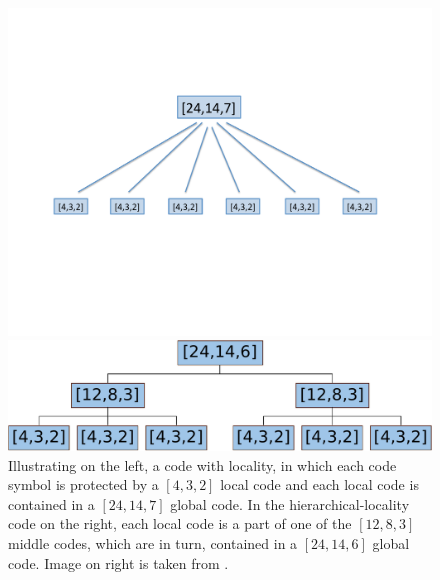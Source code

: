 \begin{figure}[h!]
\centering
		\begin{minipage}[b]{0.45\textwidth}
			\includegraphics[scale=.42]{src/Figures/chap4/flat} 
		\end{minipage}
		\hspace*{0.55in}
		\begin{minipage}[b]{0.44\textwidth}
			\includegraphics[scale=.38]{src/Figures/chap4/hierarchical}  
		\end{minipage}
	\caption{Illustrating on the left, a code with locality, in which each code symbol is protected by a $[4,3,2]$ local code and each local code is contained in a $[24,14,7]$ global code. In the hierarchical-locality code on the right, each local code is a part of one of the $[12,8,3]$ middle codes, which are in turn, contained in a $[24,14,6]$ global code. Image on right is taken from \cite{SasAgaKum_loc}.} \label{fig:hierarchical} 
\end{figure}

